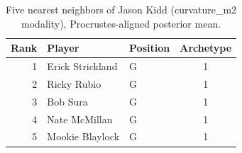 \begin{table}[htbp]
  \centering\small
  \begin{tabular}{rllc}
    \toprule
    Rank & Player & Position & Archetype \\
    \midrule
    1 & Erick Strickland & G & 1 \\
    2 & Ricky Rubio & G & 1 \\
    3 & Bob Sura & G & 1 \\
    4 & Nate McMillan & G & 1 \\
    5 & Mookie Blaylock & G & 1 \\
    \bottomrule
  \end{tabular}
  \caption{Five nearest neighbors of Jason Kidd (curvature_m2 modality), Procrustes-aligned posterior mean.}
  \label{tab:Jason_Kidd_neighbors_curvature_m2}
\end{table}

